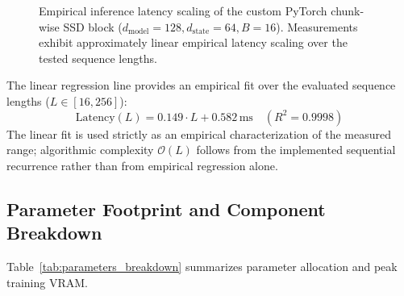 \documentclass[journal]{IEEEtran}
\begin{document}
\begin{figure}[!t]
\centering
{}
\caption{Empirical inference latency scaling of the custom PyTorch chunk-wise SSD block ($d_{\text{model}}=128, d_{\text{state}}=64, B=16$). Measurements exhibit approximately linear empirical latency scaling over the tested sequence lengths.}
\label{fig:scaling}
\end{figure}

The linear regression line provides an empirical fit over the evaluated sequence lengths ($L \in [16, 256]$):
\begin{equation}
\text{Latency}(L) = 0.149 \cdot L + 0.582\,\text{ms} \quad (R^2 = 0.9998)
\end{equation}
The linear fit is used strictly as an empirical characterization of the measured range; algorithmic complexity $\mathcal{O}(L)$ follows from the implemented sequential recurrence rather than from empirical regression alone.

\subsection{Parameter Footprint and Component Breakdown}
Table~\ref{tab:parameters_breakdown} summarizes parameter allocation and peak training VRAM.
\end{document}
